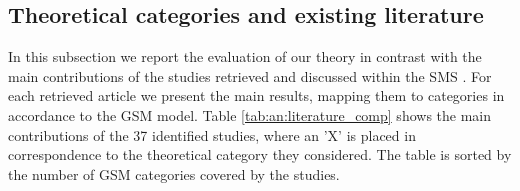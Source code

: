 \documentclass[10pt,journal,letterpaper,compsoc]{IEEEtran}
\begin{document}
\subsection{Theoretical categories and existing literature}
\label{sect:theory:validation:sms}

In this subsection we report the evaluation of our theory in contrast with the main contributions of the studies retrieved and discussed within the SMS \cite{SMS}. For each retrieved article we present the main results, mapping them to categories in accordance to the GSM model. Table \ref{tab:an:literature_comp} shows the main contributions of the 37 identified studies, where an 'X' is placed in correspondence to the theoretical category they considered. The table is sorted by the number of GSM categories covered by the studies.
\end{document}
